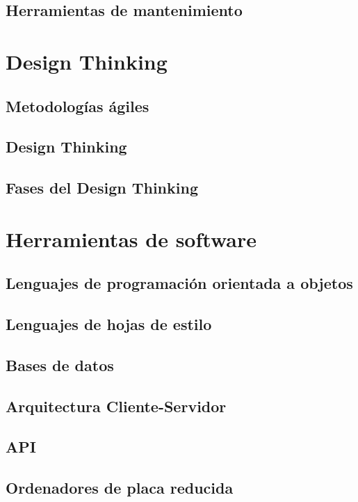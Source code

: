 \subsection{Herramientas de mantenimiento}

\section{Design Thinking}

\subsection{Metodologías ágiles}

\subsection{Design Thinking}

\subsection{Fases del Design Thinking}


\section{Herramientas de software}

\subsection{Lenguajes de programación orientada a objetos}

\subsection{Lenguajes de hojas de estilo}

\subsection{Bases de datos}

\subsection{Arquitectura Cliente-Servidor}

\subsection{API}

\subsection{Ordenadores de placa reducida}



 




